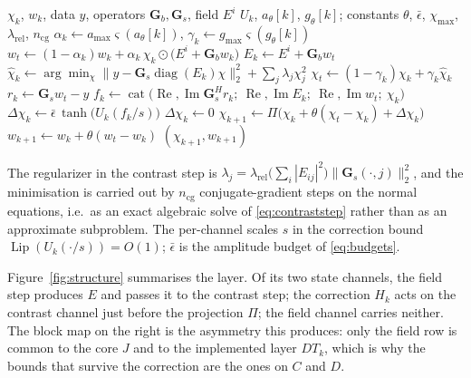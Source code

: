 \documentclass[journal,cmes,article,submit,moreauthors,pdftex]{Definitions/tsp}
\newcommand{\norm}[1]{\lVert #1 \rVert}
\begin{document}
\begin{algorithm}[t]
\caption{One unrolled layer $T_k$ of \eqref{eq:layer-code}: physics core
$T^{\mathrm{phys}}_{\alpha_k,\gamma_k}$ followed by the learned correction $H_k$.}
\label{alg:layer}
\begin{algorithmic}[1]
\Require $\chi_k$, $w_k$, data $y$, operators $\mathbf{G}_b,\mathbf{G}_s$, field $E^i$
\Require $U_k$, $a_\theta[k]$, $g_\theta[k]$;
constants $\theta$, $\bar\epsilon$, $\chi_{\max}$, $\lambda_{\mathrm{rel}}$, $n_{\mathrm{cg}}$
\State $\alpha_k\gets a_{\max}\varsigma(a_\theta[k])$,
       $\gamma_k\gets g_{\max}\varsigma(g_\theta[k])$
\State $w_t\gets(1-\alpha_k)w_k+\alpha_k\,\chi_k\odot\big(E^i+\mathbf{G}_b w_k\big)$
\State $E_k\gets E^i+\mathbf{G}_b w_t$
\State $\hat\chi_k\gets\arg\min_{\chi}\norm{y-\mathbf{G}_s\operatorname{diag}(E_k)\chi}_2^2+\sum_j\lambda_j\chi_j^2$
\State $\chi_t\gets(1-\gamma_k)\chi_k+\gamma_k\hat\chi_k$
  \State $r_k\gets\mathbf{G}_s w_t-y$
  \State $f_k\gets\operatorname{cat}\big(\operatorname{Re},\operatorname{Im}\mathbf{G}_s^{H}r_k;\
         \operatorname{Re},\operatorname{Im}E_k;\
         \operatorname{Re},\operatorname{Im}w_t;\
         \chi_k\big)$
  \State $\Delta\chi_k\gets \bar\epsilon\,\tanh\!\big(U_k(f_k/s)\big)$
         \Comment{learned correction}
\Else
  \State $\Delta\chi_k\gets 0$
\EndIf
\State $\chi_{k+1}\gets \Pi\big(\chi_k+\theta(\chi_t-\chi_k)+\Delta\chi_k\big)$
\State $w_{k+1}\gets w_k+\theta(w_t-w_k)$
\State \Return $(\chi_{k+1},w_{k+1})$
\end{algorithmic}
\end{algorithm}
The regularizer in the contrast step is
$\lambda_j=\lambda_{\mathrm{rel}}\big(\sum_i|E_{ij}|^2\big)\norm{\mathbf{G}_s(\cdot,j)}_2^2$, and
the minimisation is carried out by $n_{\mathrm{cg}}$ conjugate-gradient steps on the normal
equations, i.e.\ as an exact algebraic solve of \eqref{eq:contraststep} rather than as an
approximate subproblem. The per-channel scales $s$ in the correction bound
$\operatorname{Lip}(U_k(\cdot/s))=O(1)$; $\bar\epsilon$ is the amplitude budget of
\eqref{eq:budgets}.

Figure~\ref{fig:structure} summarises the layer. Of its two state channels, the field step
produces $E$ and passes it to the contrast step; the correction $H_k$ acts on the contrast channel
just before the projection $\Pi$; the field channel carries neither. The block map on the right is
the asymmetry this produces: only the field row is common to the core $J$ and to the implemented
layer $DT_k$, which is why the bounds that survive the correction are the ones on $C$ and $D$.
\end{document}
